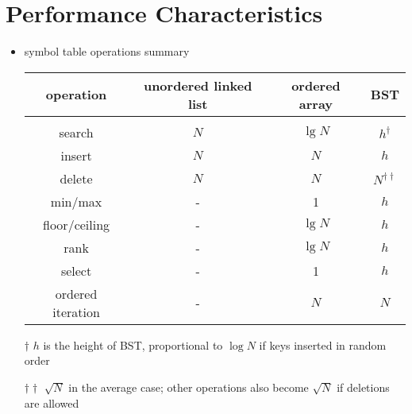 \documentclass[8pt,a4paper,compress]{beamer}
\begin{document}
\section{Performance Characteristics}
\begin{frame}[fragile]
\begin{itemize}
\item symbol table operations summary
\begin{center}
\begin{tabular}{cccc}
\textbf{operation} & \textbf{unordered linked list} & \textbf{ordered array} & \textbf{BST} \\ \hline \\
search & $N$ & $\lg N$ & $h^\dagger$ \\
insert & $N$ & $N$ & $h$ \\
delete & $N$ & $N$ & $N^{\dagger\dagger}$ \\
min/max & - & 1 & $h$ \\
floor/ceiling & - & $\lg N$ & $h$\\
rank & - & $\lg N$ & $h$ \\
select & - & 1 & $h$ \\
ordered iteration & - & $N$ & $N$ 
\end{tabular} 

\bigskip

\tiny $\dagger$ $h$ is the height of BST, proportional to $\log N$ if keys inserted in random order

$\dagger\dagger$ $\sqrt{N}$ in the average case; other operations also become $\sqrt{N}$ if deletions are allowed
\end{center}
\end{itemize}
\end{frame}
\end{document}
